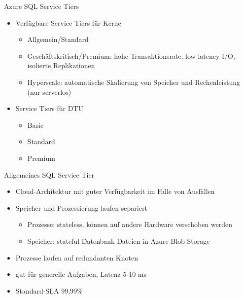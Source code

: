 
\begin{flashcard}[Definition]{Azure SQL Service Tiers}
  \begin{itemize}
    \item Verfügbare Service Tiers für Kerne
      \begin{itemize}
        \item Allgemein/Standard
        \item Geschäftskritisch/Premium: hohe Transaktionsrate, low-latency I/O,
          \newline isolierte Replikationen
        \item Hyperscale: automatische Skalierung von Speicher und Rechenleistung\newline
          (nur serverlos)
      \end{itemize}
    \item Service Tiers für DTU
      \begin{itemize}
        \item Basic
        \item Standard
        \item Premium
      \end{itemize}
  \end{itemize}
\end{flashcard}

\begin{flashcard}[Definition]{Allgemeines SQL Service Tier}
  \begin{itemize}
    \item Cloud-Architektur mit guter Verfügbarkeit im Falle von Ausfällen
    \item Speicher und Prozessierung laufen separiert
      \begin{itemize}
        \item Prozesse: stateless, können auf andere Hardware verschoben werden
        \item Speicher: stateful Datenbank-Dateien in Azure Blob Storage
      \end{itemize}
    \item Prozesse laufen auf redundanten Knoten
    \item gut für generelle Aufgaben, Latenz 5-10 ms
    \item Standard-SLA 99,99\%
  \end{itemize}
\end{flashcard}

